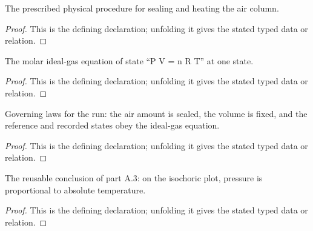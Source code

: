 \begin{definition}[ExperimentalConditions]
  \label{decl:physics:IPhO_2026_4_A_5:ExperimentalConditions}
  The prescribed physical procedure for sealing and heating the air column.
\end{definition}
\begin{proof}
  This is the defining declaration; unfolding it gives the stated typed data or relation.
\end{proof}

\begin{definition}[SatisfiesIdealGasLawAt]
  \label{decl:physics:IPhO_2026_4_A_5:SatisfiesIdealGasLawAt}
  The molar ideal-gas equation of state “P V = n R T” at one state.
\end{definition}
\begin{proof}
  This is the defining declaration; unfolding it gives the stated typed data or relation.
\end{proof}

\begin{definition}[GoverningLaws]
  \label{decl:physics:IPhO_2026_4_A_5:GoverningLaws}
  Governing laws for the run: the air amount is sealed, the volume is fixed, and the reference and recorded states obey the ideal-gas equation.
\end{definition}
\begin{proof}
  This is the defining declaration; unfolding it gives the stated typed data or relation.
\end{proof}

\begin{definition}
  \label{decl:physics:IPhO_2026_4_A_5:PreviousPartA3Linearity}
  The reusable conclusion of part A.3: on the isochoric plot, pressure is proportional to absolute temperature.
\end{definition}
\begin{proof}
  This is the defining declaration; unfolding it gives the stated typed data or relation.
\end{proof}

